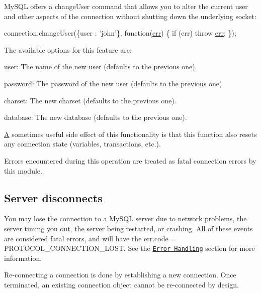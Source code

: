 My\+S\+Q\+L offers a change\+User command that allows you to alter the current user and other aspects of the connection without shutting down the underlying socket\+:


\begin{DoxyCode}
connection.changeUser(\{user : \textcolor{stringliteral}{'john'}\}, \textcolor{keyword}{function}(\hyperlink{message_8cpp_aede5746344fdce99647541101eaa7f06}{err}) \{
  \textcolor{keywordflow}{if} (err) \textcolor{keywordflow}{throw} \hyperlink{message_8cpp_aede5746344fdce99647541101eaa7f06}{err};
\});
\end{DoxyCode}


The available options for this feature are\+:


\begin{DoxyItemize}
\item {\ttfamily user}\+: The name of the new user (defaults to the previous one).
\item {\ttfamily password}\+: The password of the new user (defaults to the previous one).
\item {\ttfamily charset}\+: The new charset (defaults to the previous one).
\item {\ttfamily database}\+: The new database (defaults to the previous one).
\end{DoxyItemize}

\hyperlink{class_a}{A} sometimes useful side effect of this functionality is that this function also resets any connection state (variables, transactions, etc.).

Errors encountered during this operation are treated as fatal connection errors by this module.

\subsection*{Server disconnects}

You may lose the connection to a My\+S\+Q\+L server due to network problems, the server timing you out, the server being restarted, or crashing. All of these events are considered fatal errors, and will have the {\ttfamily err.\+code = \textquotesingle{}P\+R\+O\+T\+O\+C\+O\+L\+\_\+\+C\+O\+N\+N\+E\+C\+T\+I\+O\+N\+\_\+\+L\+O\+S\+T\textquotesingle{}}. See the \href{#error-handling}{\tt Error Handling} section for more information.

Re-\/connecting a connection is done by establishing a new connection. Once terminated, an existing connection object cannot be re-\/connected by design.

